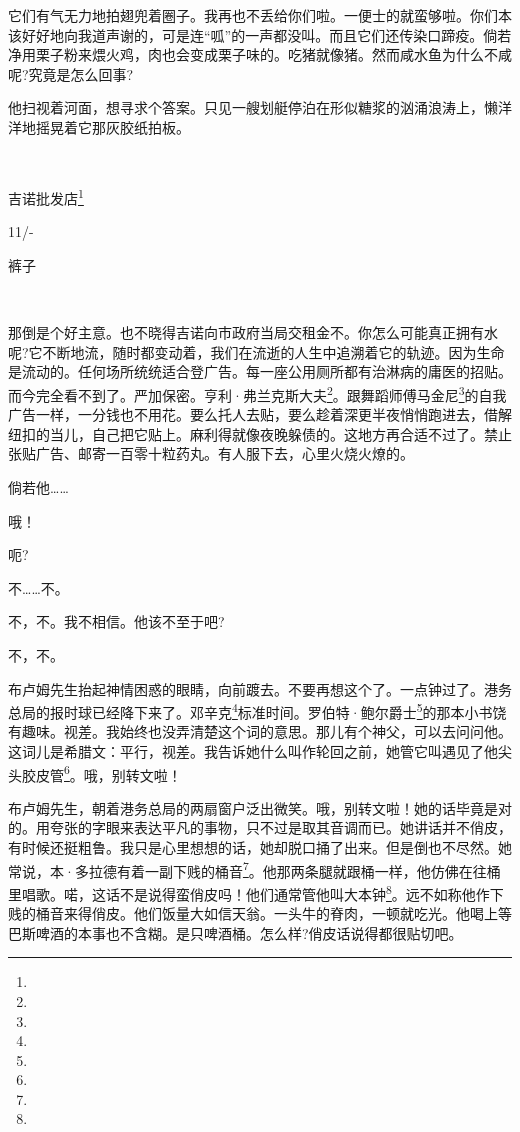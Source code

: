 \par 它们有气无力地拍翅兜着圈子。我再也不丢给你们啦。一便士的就蛮够啦。你们本该好好地向我道声谢的，可是连“呱”的一声都没叫。而且它们还传染口蹄疫。倘若净用栗子粉来煨火鸡，肉也会变成栗子味的。吃猪就像猪。然而咸水鱼为什么不咸呢?究竟是怎么回事?
\par 他扫视着河面，想寻求个答案。只见一艘划艇停泊在形似糖浆的汹涌浪涛上，懒洋洋地摇晃着它那灰胶纸拍板。
\par  
\par 吉诺批发店\footnote{}
\par 11/-
\par 裤子
\par  
\par 那倒是个好主意。也不晓得吉诺向市政府当局交租金不。你怎么可能真正拥有水呢?它不断地流，随时都变动着，我们在流逝的人生中追溯着它的轨迹。因为生命是流动的。任何场所统统适合登广告。每一座公用厕所都有治淋病的庸医的招贴。而今完全看不到了。严加保密。亨利·弗兰克斯大夫\footnote{}。跟舞蹈师傅马金尼\footnote{}的自我广告一样，一分钱也不用花。要么托人去贴，要么趁着深更半夜悄悄跑进去，借解纽扣的当儿，自己把它贴上。麻利得就像夜晚躲债的。这地方再合适不过了。禁止张贴广告、邮寄一百零十粒药丸。有人服下去，心里火烧火燎的。
\par 倘若他……
\par 哦！
\par 呃?
\par 不……不。
\par 不，不。我不相信。他该不至于吧?
\par 不，不。
\par 布卢姆先生抬起神情困惑的眼睛，向前踱去。不要再想这个了。一点钟过了。港务总局的报时球已经降下来了。邓辛克\footnote{}标准时间。罗伯特·鲍尔爵士\footnote{}的那本小书饶有趣味。视差。我始终也没弄清楚这个词的意思。那儿有个神父，可以去问问他。这词儿是希腊文：平行，视差。我告诉她什么叫作轮回之前，她管它叫遇见了他尖头胶皮管\footnote{}。哦，别转文啦！
\par 布卢姆先生，朝着港务总局的两扇窗户泛出微笑。哦，别转文啦！她的话毕竟是对的。用夸张的字眼来表达平凡的事物，只不过是取其音调而已。她讲话并不俏皮，有时候还挺粗鲁。我只是心里想想的话，她却脱口捅了出来。但是倒也不尽然。她常说，本·多拉德有着一副下贱的桶音\footnote{}。他那两条腿就跟桶一样，他仿佛在往桶里唱歌。喏，这话不是说得蛮俏皮吗！他们通常管他叫大本钟\footnote{}。远不如称他作下贱的桶音来得俏皮。他们饭量大如信天翁。一头牛的脊肉，一顿就吃光。他喝上等巴斯啤酒的本事也不含糊。是只啤酒桶。怎么样?俏皮话说得都很贴切吧。
